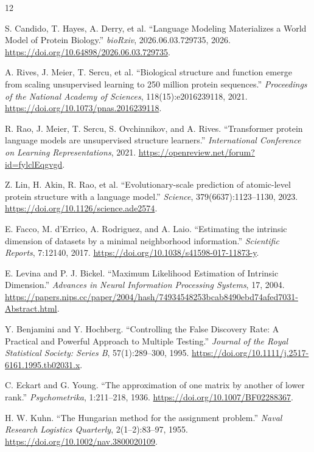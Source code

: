 \documentclass[11pt]{article}
\begin{document}
\clearpage
\begin{thebibliography}{12}

S. Candido, T. Hayes, A. Derry, et al.
``Language Modeling Materializes a World Model of Protein Biology.''
\textit{bioRxiv}, 2026.06.03.729735, 2026.
\url{https://doi.org/10.64898/2026.06.03.729735}.

A. Rives, J. Meier, T. Sercu, et al.
``Biological structure and function emerge from scaling unsupervised learning to 250 million protein sequences.''
\textit{Proceedings of the National Academy of Sciences}, 118(15):e2016239118, 2021.
\url{https://doi.org/10.1073/pnas.2016239118}.

R. Rao, J. Meier, T. Sercu, S. Ovchinnikov, and A. Rives.
``Transformer protein language models are unsupervised structure learners.''
\textit{International Conference on Learning Representations}, 2021.
\url{https://openreview.net/forum?id=fylclEqgvgd}.

Z. Lin, H. Akin, R. Rao, et al.
``Evolutionary-scale prediction of atomic-level protein structure with a language model.''
\textit{Science}, 379(6637):1123--1130, 2023.
\url{https://doi.org/10.1126/science.ade2574}.

E. Facco, M. d'Errico, A. Rodriguez, and A. Laio.
``Estimating the intrinsic dimension of datasets by a minimal neighborhood information.''
\textit{Scientific Reports}, 7:12140, 2017.
\url{https://doi.org/10.1038/s41598-017-11873-y}.

E. Levina and P. J. Bickel.
``Maximum Likelihood Estimation of Intrinsic Dimension.''
\textit{Advances in Neural Information Processing Systems}, 17, 2004.
\url{https://papers.nips.cc/paper/2004/hash/74934548253bcab8490ebd74afed7031-Abstract.html}.

Y. Benjamini and Y. Hochberg.
``Controlling the False Discovery Rate: A Practical and Powerful Approach to Multiple Testing.''
\textit{Journal of the Royal Statistical Society: Series B}, 57(1):289--300, 1995.
\url{https://doi.org/10.1111/j.2517-6161.1995.tb02031.x}.

C. Eckart and G. Young.
``The approximation of one matrix by another of lower rank.''
\textit{Psychometrika}, 1:211--218, 1936.
\url{https://doi.org/10.1007/BF02288367}.

H. W. Kuhn.
``The Hungarian method for the assignment problem.''
\textit{Naval Research Logistics Quarterly}, 2(1--2):83--97, 1955.
\url{https://doi.org/10.1002/nav.3800020109}.


\end{thebibliography}
\end{document}

